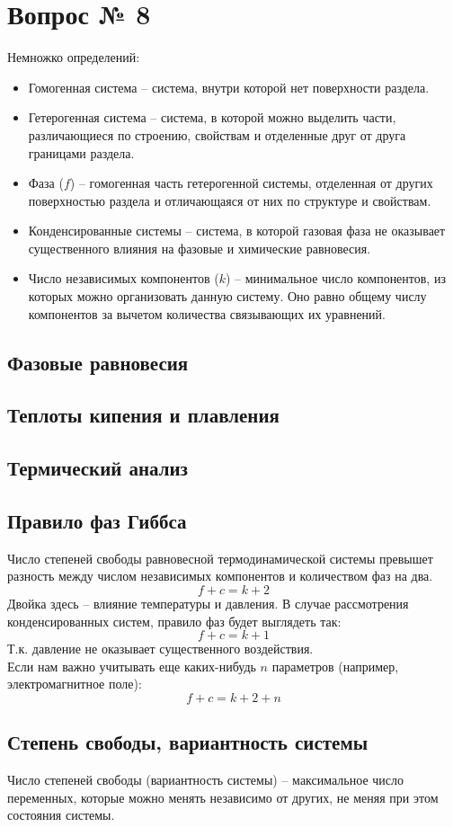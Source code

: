 \documentclass[14pt,a4paper]{scrartcl}
\begin{document}
	\section*{Вопрос № 8}
	Немножко определений:
	\begin{itemize}
		\item Гомогенная система -- система, внутри которой нет поверхности раздела.
		\item Гетерогенная система -- система, в которой можно выделить части, различающиеся по строению, свойствам и отделенные друг от друга границами раздела.
		\item Фаза ($f$) -- гомогенная часть гетерогенной системы, отделенная от других поверхностью раздела и отличающаяся от них по структуре и свойствам.
		\item Конденсированные системы -- система, в которой газовая фаза не оказывает существенного влияния на фазовые и химические равновесия.
		\item Число независимых компонентов ($k$) -- минимальное число компонентов, из которых можно организовать данную систему. Оно равно общему числу компонентов за вычетом количества связывающих их уравнений.
	\end{itemize}
	\subsection*{Фазовые равновесия}
	\subsection*{Теплоты кипения и плавления}
	\subsection*{Термический анализ}
	\subsection*{Правило фаз Гиббса}
	Число степеней свободы равновесной термодинамической системы превышет разность между числом независимых компонентов и количеством фаз на два.
	$$ f+c = k+2 $$
	Двойка здесь -- влияние температуры и давления. В случае рассмотрения конденсированных систем, правило фаз будет выглядеть так:
	$$ f+c = k+1 $$
	Т.к. давление не оказывает существенного воздействия. \\
	Если нам важно учитывать еще каких-нибудь $n$ параметров (например, электромагнитное поле):
	$$ f+c = k+2 + n $$
	
	\subsection*{Степень свободы, вариантность системы}
	Число степеней свободы (вариантность системы) -- максимальное число переменных, которые можно менять независимо от других, не меняя при этом состояния системы.
\end{document}
